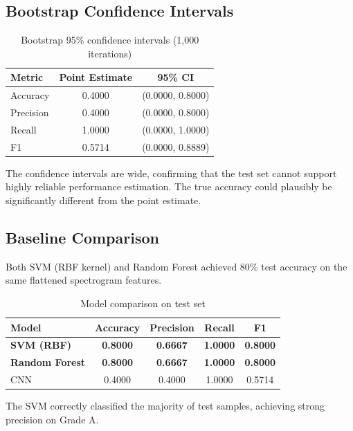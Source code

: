 \documentclass[12pt,a4paper,oneside]{report}
\begin{document}
\subsection{Bootstrap Confidence Intervals}

\begin{table}[H]
\centering
\begin{tabular}{lcc}
\toprule
Metric & Point Estimate & 95\% CI \\
\midrule
Accuracy & 0.4000 & (0.0000, 0.8000) \\
Precision & 0.4000 & (0.0000, 0.8000) \\
Recall & 1.0000 & (0.0000, 1.0000) \\
F1 & 0.5714 & (0.0000, 0.8889) \\
\bottomrule
\end{tabular}
\caption{Bootstrap 95\% confidence intervals (1,000 iterations)}
\label{tab:bootstrap}
\end{table}

The confidence intervals are wide, confirming that the test set cannot support highly reliable performance estimation. The true accuracy could plausibly be significantly different from the point estimate.

\subsection{Baseline Comparison}

Both SVM (RBF kernel) and Random Forest achieved 80\% test accuracy on the same flattened spectrogram features.

\begin{table}[H]
\centering
\begin{tabular}{lcccc}
\toprule
Model & Accuracy & Precision & Recall & F1 \\
\midrule
\textbf{SVM (RBF)} & \textbf{0.8000} & \textbf{0.6667} & \textbf{1.0000} & \textbf{0.8000} \\
\textbf{Random Forest} & \textbf{0.8000} & \textbf{0.6667} & \textbf{1.0000} & \textbf{0.8000} \\
CNN & 0.4000 & 0.4000 & 1.0000 & 0.5714 \\
\bottomrule
\end{tabular}
\caption{Model comparison on test set}
\label{tab:comparison}
\end{table}

The SVM correctly classified the majority of test samples, achieving strong precision on Grade A.
\end{document}
